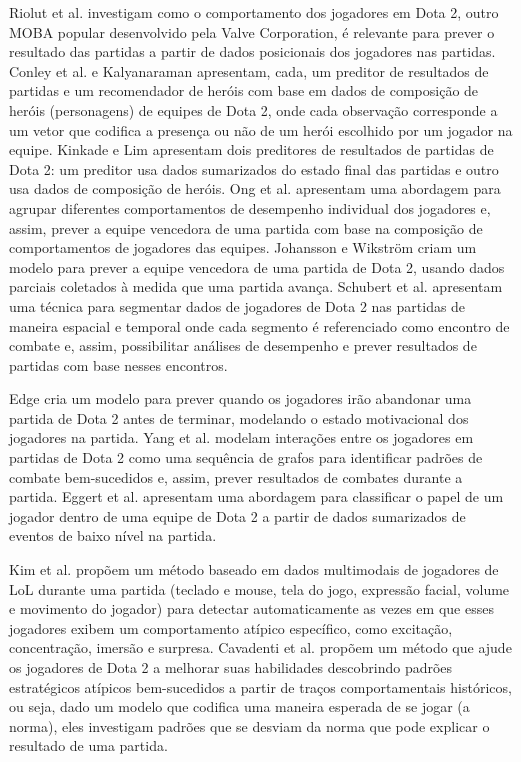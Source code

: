 Riolut et al. \cite{rioult2014mining} investigam como o comportamento dos jogadores em Dota 2, outro MOBA popular desenvolvido pela Valve Corporation, é relevante para prever o resultado das partidas a partir de dados posicionais dos jogadores nas partidas. Conley et al. \cite{conley2013does} e Kalyanaraman \cite{kalyanaraman2014win} apresentam, cada, um preditor de resultados de partidas e um recomendador de heróis com base em dados de composição de heróis (personagens) de equipes de Dota 2, onde cada observação corresponde a um vetor que codifica a presença ou não de um herói escolhido por um jogador na equipe. Kinkade e Lim \cite{kinkade2015dota} apresentam dois preditores de resultados de partidas de Dota 2: um preditor usa dados sumarizados do estado final das partidas e outro usa dados de composição de heróis. Ong et al. \cite{ong2015player} apresentam uma abordagem para agrupar diferentes comportamentos de desempenho individual dos jogadores e, assim, prever a equipe vencedora de uma partida com base na composição de comportamentos de jogadores das equipes. Johansson e Wikstr\"om \cite {johansson2015result} criam um modelo para prever a equipe vencedora de uma partida de Dota 2, usando dados parciais coletados à medida que uma partida avança. Schubert et al. \cite{schubert2016esports} apresentam uma técnica para segmentar dados de jogadores de Dota 2 nas partidas de maneira espacial e temporal onde cada segmento é referenciado como encontro de combate e, assim, possibilitar análises de desempenho e prever resultados de partidas com base nesses encontros.

Edge \cite{edge2013predicting} cria um modelo para prever quando os jogadores irão abandonar uma partida de Dota 2 antes de terminar, modelando o estado motivacional dos jogadores na partida. Yang et al. \cite{yang2014identifying} modelam interações entre os jogadores em partidas de Dota 2 como uma sequência de grafos para identificar padrões de combate bem-sucedidos e, assim, prever resultados de combates durante a partida. Eggert et al. \cite{eggert2015classification} apresentam uma abordagem para classificar o papel de um jogador dentro de uma equipe de Dota 2 a partir de dados sumarizados de eventos de baixo nível na partida.

Kim et al. \cite{kim2015efficiently} propõem um método baseado em dados multimodais de jogadores de LoL durante uma partida (teclado e mouse, tela do jogo, expressão facial, volume e movimento do jogador) para detectar automaticamente as vezes em que esses jogadores exibem um comportamento atípico específico, como excitação, concentração, imersão e surpresa. Cavadenti et al. \cite{cavadenti2016did} propõem um método que ajude os jogadores de Dota 2 a melhorar suas habilidades descobrindo padrões estratégicos atípicos bem-sucedidos a partir de traços comportamentais históricos, ou seja, dado um modelo que codifica uma maneira esperada de se jogar (a norma), eles investigam padrões que se desviam da norma que pode explicar o resultado de uma partida.

